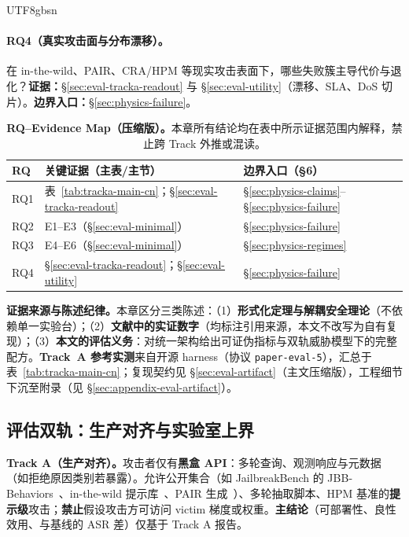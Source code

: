 \documentclass[letterpaper,twocolumn,10pt]{article}
\begin{document}
\begin{CJK}{UTF8}{gbsn}
\paragraph{RQ4（真实攻击面与分布漂移）。}
在 in-the-wild、PAIR、CRA/HPM 等现实攻击表面下，哪些失败簇主导代价与退化？\;\textbf{证据：}\S\ref{sec:eval-tracka-readout} 与 \S\ref{sec:eval-utility}（漂移、SLA、DoS 切片）。\;\textbf{边界入口：}\S\ref{sec:physics-failure}。

\begin{table}[t]
\centering
\small
\setlength{\tabcolsep}{3pt}
\begin{tabular}{@{}p{0.6cm}p{2.55cm}p{2.85cm}@{}}
\toprule
\textbf{RQ} & \textbf{关键证据（主表/主节）} & \textbf{边界入口（§6）} \\
\midrule
RQ1 & 表~\ref{tab:tracka-main-cn}；\S\ref{sec:eval-tracka-readout} & \S\ref{sec:physics-claims}--\S\ref{sec:physics-failure} \\
RQ2 & E1--E3（\S\ref{sec:eval-minimal}） & \S\ref{sec:physics-failure} \\
RQ3 & E4--E6（\S\ref{sec:eval-minimal}） & \S\ref{sec:physics-regimes} \\
RQ4 & \S\ref{sec:eval-tracka-readout}；\S\ref{sec:eval-utility} & \S\ref{sec:physics-failure} \\
\bottomrule
\end{tabular}
\caption{\textbf{RQ--Evidence Map（压缩版）。}本章所有结论均在表中所示证据范围内解释，禁止跨 Track 外推或混读。}
\label{tab:rq-evidence-map}
\end{table}

\medskip
\noindent\textbf{证据来源与陈述纪律。}本章区分三类陈述：（1）\textbf{形式化定理与解耦安全理论}（不依赖单一实验台）；（2）\textbf{文献中的实证数字}（均标注引用来源，本文不改写为自有复现）；（3）\textbf{本文的评估义务}：对统一架构给出可证伪指标与双轨威胁模型下的完整配方。\textbf{Track~A 参考实测}来自开源 harness（协议 \texttt{paper-eval-5}），汇总于表~\ref{tab:tracka-main-cn}；复现契约见 \S\ref{sec:eval-artifact}（主文压缩版），工程细节下沉至附录（见 \S\ref{sec:appendix-eval-artifact}）。

\subsection{评估双轨：生产对齐与实验室上界}
\label{sec:eval-tracks}

\textbf{Track A（生产对齐）。}攻击者仅有\textbf{黑盒 API}：多轮查询、观测响应与元数据（如拒绝原因类别若暴露）。允许公开集合（如 JailbreakBench 的 JBB-Behaviors~\cite{jailbreakbench}、in-the-wild 提示库~\cite{wild-jailbreak-prompts}、PAIR 生成~\cite{pair-jailbreak}）、多轮抽取脚本、HPM 基准的\textbf{提示级}攻击；\textbf{禁止}假设攻击方可访问 victim 梯度或权重。\textbf{主结论}（可部署性、良性效用、与基线的 ASR 差）仅基于 Track A 报告。


\end{CJK}
\end{document}

